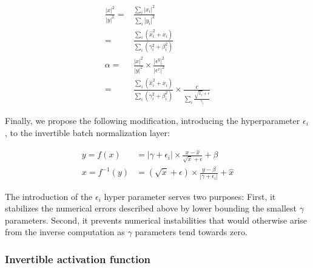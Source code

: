 \documentclass[twocolumn]{bmcart}
\begin{document}
\begin{subequations}
\begin{align}
\frac{|x|^2}{|y|^2} =& \frac{\sum_i |x_i|^2}{\sum_i|y_i|^2} \\
                    =& \frac{\sum_i (\hat{x}_i^2 + \dot{x_i})}{\sum_i (\gamma_i^2 + \beta_i^2)} \\
\alpha =& \frac{|x|^2}{|y|^2} \times  \frac{|\epsilon^y|^2}{|\epsilon^x|^2}  \\
       =& \frac{\sum_i (\hat{x}_i^2 + \dot{x_i})}{\sum_i (\gamma_i^2 + \beta_i^2)} \times \frac{c}{\sum_i \frac{\sqrt{\dot{x_i}}+\epsilon}{\gamma_i}}
\end{align}
\end{subequations}


Finally, we propose the following modification, introducing the hyperparameter $\epsilon_i$, to the invertible batch normalization layer:

\begin{subequations}
\begin{align}
y = f(x) &= |\gamma + \epsilon_i| \times \frac{x - \hat{x}}{\sqrt{\dot{x}} + \epsilon} + \beta \\
x = f^{-1}(y) &= (\sqrt{\dot{x}} + \epsilon) \times \frac{y -  \beta}{|\gamma + \epsilon_i|}  + \hat{x}
\end{align}
\end{subequations}

The introduction of the $\epsilon_i$ hyper parameter serves two purposes:
First, it stabilizes the numerical errors described above by lower bounding the smallest $\gamma$ parameters.
Second, it prevents numerical instabilities that would otherwise arise from the inverse computation as $\gamma$ parameters tend towards zero.

\subsubsection{Invertible activation function}
\end{document}
